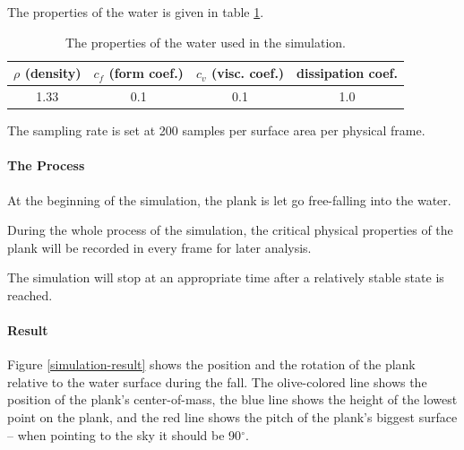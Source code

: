 The properties of the water is given in table \ref{simulation-water-properties}.

\begin{table}[h]
	\centering
	\begin{tabular}{ c c c c }
		\hline
		$\rho$ {\footnotesize(density)} & $c_f$ {\footnotesize(form coef.)} & $c_v$ {\footnotesize(visc. coef.)} & {\small dissipation coef.} \\
		\hline
		1.33 & 0.1 & 0.1 & 1.0 \\
		\hline
	\end{tabular}
	\caption{The properties of the water used in the simulation.}
	\label{simulation-water-properties}
\end{table}

The sampling rate is set at 200 samples per surface area per physical frame.

\paragraph*{The Process}

At the beginning of the simulation, the plank is let go free-falling into the water.

During the whole process of the simulation, the critical physical properties of the plank will be recorded in every frame for later analysis.

The simulation will stop at an appropriate time after a relatively stable state is reached.

\paragraph*{Result}

Figure \ref{simulation-result} shows the position and the rotation of the plank relative to the water surface during the fall.
The olive-colored line shows the position of the plank's center-of-mass, the blue line shows the height of the lowest point on the plank, and the red line shows the pitch of the plank's biggest surface -- when pointing to the sky it should be 90$^\circ$.

